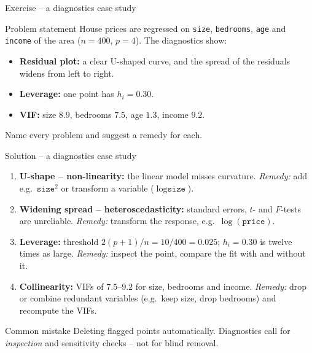 \documentclass[aspectratio=169,11pt]{beamer}
\begin{document}
\begin{frame}{Exercise -- a diagnostics case study}
  \begin{block}{Problem statement}
    House prices are regressed on \texttt{size}, \texttt{bedrooms},
    \texttt{age} and \texttt{income} of the area ($n=400$, $p=4$). The
    diagnostics show:
    \begin{itemize}
      \item \textbf{Residual plot:} a clear U-shaped curve, and the spread
            of the residuals widens from left to right.
      \item \textbf{Leverage:} one point has $h_i=0.30$.
      \item \textbf{VIF:} size $8.9$, bedrooms $7.5$, age $1.3$, income $9.2$.
    \end{itemize}
    Name every problem and suggest a remedy for each.
  \end{block}
\end{frame}

\begin{frame}{Solution -- a diagnostics case study}
  \begin{enumerate}\setlength{\itemsep}{4pt}
    \item \textbf{U-shape -- non-linearity:} the linear model misses
          curvature. \emph{Remedy:} add e.g.\ $\texttt{size}^2$ or transform
          a variable ($\log\texttt{size}$).
    \item \textbf{Widening spread -- heteroscedasticity:} standard errors,
          $t$- and $F$-tests are unreliable. \emph{Remedy:} transform the
          response, e.g.\ $\log(\texttt{price})$.
    \item \textbf{Leverage:} threshold $2(p+1)/n=10/400=0.025$; $h_i=0.30$ is
          twelve times as large. \emph{Remedy:} inspect the point, compare the
          fit with and without it.
    \item \textbf{Collinearity:} VIFs of $7.5$--$9.2$ for size, bedrooms and
          income. \emph{Remedy:} drop or combine redundant variables (e.g.\
          keep size, drop bedrooms) and recompute the VIFs.
  \end{enumerate}
  \begin{alertblock}{Common mistake}
    Deleting flagged points automatically. Diagnostics call for
    \emph{inspection} and sensitivity checks -- not for blind removal.
  \end{alertblock}
\end{frame}
\end{document}
